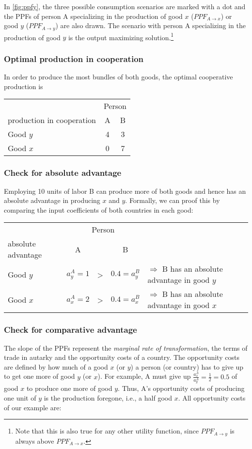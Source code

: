 {In \autoref{fig:ppfy}, the three possible consumption scenarios are marked with a dot and the PPFs of person A specializing in the production of good $x$ ($PPF_{A\rightarrow x}$) or good $y$ ($PPF_{A\rightarrow y}$) are also drawn. 
The scenario with person A specializing in the production of good $y$ is the output maximizing solution.\footnote{Note that this is also true for any other utility function, since $PPF_{A\rightarrow y}$ is always above $PPF_{A\rightarrow x}$.}

\subsubsection{Optimal production in cooperation} In order to produce the most bundles of both goods, the optimal cooperative production is 
				\begin{center}
	\begin{tabular}{lcc}\toprule
		&\multicolumn{2}{c}{Person} \\\cmidrule{2-3}
		production in cooperation	&A &B \\		\midrule
		Good $y$ & 4 & 3\\
		Good $x$ & 0 & 7 \\\bottomrule
	\end{tabular}
\end{center}\medskip


\subsubsection{Check for absolute advantage}
Employing 10 units of labor B can produce more of both goods and hence has an absolute advantage in producing $x$ and $y$. Formally, we can proof this by comparing the input coefficients of both countries in each good: 
\begin{center}
	\begin{tabular}{lcccl}\toprule
		&\multicolumn{3}{c}{Person}&\\\cmidrule{2-4}
		absolute advantage	&A & &B& \\		\midrule
		Good $y$ & $a_y^A=1$ & > & $0.4=a_y^B$ & $\Rightarrow$ B has an absolute advantage in good $y$\\
		Good $x$ & $a_x^A=2$ & > & $0.4=a_x^B$ & $\Rightarrow$ B has an absolute advantage in good $x$ \\\bottomrule
	\end{tabular}
\end{center}\medskip

\subsubsection{Check for comparative advantage}
	The slope of the PPFs represent the \textit{marginal rate of transformation}, the terms of trade in autarky and the opportunity costs of a country. The opportunity costs are defined by how much of a good $x$ (or $y$) a person (or country) has to give up to get one more of good $y$ (or $x$). For example, A must give up $\frac{a_x^A}{a_y^A}=\frac{1}{2}=0.5$ of good $x$ to produce one more of good $y$. Thus, A's opportunity costs of producing one unit of $y$ is the production foregone, i.e., a half good $x$. 
	All opportunity costs of our example are:
	
}
